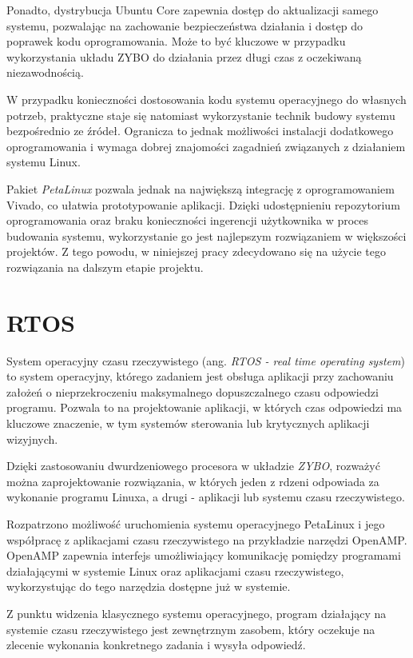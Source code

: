 Ponadto, dystrybucja Ubuntu Core zapewnia dostęp do aktualizacji samego systemu, pozwalając na zachowanie bezpieczeństwa działania i dostęp do poprawek kodu oprogramowania. Może to być kluczowe w przypadku wykorzystania układu ZYBO do działania przez długi czas z oczekiwaną niezawodnością.

W przypadku konieczności dostosowania kodu systemu operacyjnego do własnych potrzeb, praktyczne staje się natomiast wykorzystanie technik budowy systemu bezpośrednio ze źródeł. Ogranicza to jednak możliwości instalacji dodatkowego oprogramowania i wymaga dobrej znajomości zagadnień związanych z działaniem systemu Linux.

Pakiet \emph{PetaLinux} pozwala jednak na największą integrację z oprogramowaniem Vivado, co ułatwia prototypowanie aplikacji. Dzięki udostępnieniu repozytorium oprogramowania oraz braku konieczności ingerencji użytkownika w proces budowania systemu, wykorzystanie go jest najlepszym rozwiązaniem w większości projektów. Z tego powodu, w niniejszej pracy zdecydowano się na użycie tego rozwiązania na dalszym etapie projektu.

\section{RTOS}
System operacyjny czasu rzeczywistego (ang. \emph{RTOS - real time operating system}) to system operacyjny, którego zadaniem jest obsługa aplikacji przy zachowaniu założeń o nieprzekroczeniu maksymalnego dopuszczalnego czasu odpowiedzi programu. Pozwala to na projektowanie aplikacji, w których czas odpowiedzi ma kluczowe znaczenie, w tym systemów sterowania lub krytycznych aplikacji wizyjnych.

Dzięki zastosowaniu dwurdzeniowego procesora w układzie \emph{ZYBO}, rozważyć można zaprojektowanie rozwiązania, w których jeden z rdzeni odpowiada za wykonanie programu Linuxa, a drugi - aplikacji lub systemu czasu rzeczywistego.

Rozpatrzono możliwość uruchomienia systemu operacyjnego PetaLinux i jego współpracę z aplikacjami czasu rzeczywistego na przykładzie narzędzi OpenAMP.\cite{openamp-home} OpenAMP zapewnia interfejs umożliwiający komunikację pomiędzy programami działającymi w systemie Linux oraz aplikacjami czasu rzeczywistego, wykorzystując do tego narzędzia dostępne już w systemie.

Z punktu widzenia klasycznego systemu operacyjnego, program działający na systemie czasu rzeczywistego jest zewnętrznym zasobem, który oczekuje na zlecenie wykonania konkretnego zadania i wysyła odpowiedź.

